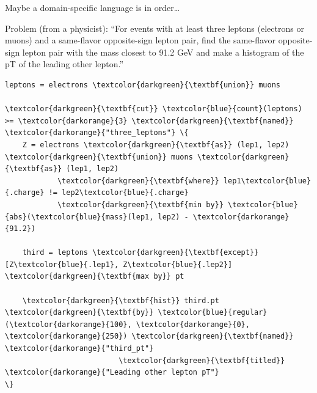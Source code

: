 \documentclass[aspectratio=169]{beamer}
\begin{document}
\begin{frame}[fragile]{Maybe a domain-specific language is in order\ldots}
\vspace{0.15 cm}
\begin{block}{Problem (from a physicist):}
``For events with at least three leptons (electrons or muons) and a same-flavor opposite-sign lepton pair, find the same-flavor opposite-sign lepton pair with the mass closest to 91.2 GeV and make a histogram of the pT of the leading other lepton.''
\end{block}

\small
\vspace{0.25 cm}
\begin{Verbatim}[commandchars=\\\{\}]
leptons = electrons \textcolor{darkgreen}{\textbf{union}} muons

\textcolor{darkgreen}{\textbf{cut}} \textcolor{blue}{count}(leptons) >= \textcolor{darkorange}{3} \textcolor{darkgreen}{\textbf{named}} \textcolor{darkorange}{"three_leptons"} \{
    Z = electrons \textcolor{darkgreen}{\textbf{as}} (lep1, lep2) \textcolor{darkgreen}{\textbf{union}} muons \textcolor{darkgreen}{\textbf{as}} (lep1, lep2)
            \textcolor{darkgreen}{\textbf{where}} lep1\textcolor{blue}{.charge} != lep2\textcolor{blue}{.charge}
            \textcolor{darkgreen}{\textbf{min by}} \textcolor{blue}{abs}(\textcolor{blue}{mass}(lep1, lep2) - \textcolor{darkorange}{91.2})

    third = leptons \textcolor{darkgreen}{\textbf{except}} [Z\textcolor{blue}{.lep1}, Z\textcolor{blue}{.lep2}] \textcolor{darkgreen}{\textbf{max by}} pt

    \textcolor{darkgreen}{\textbf{hist}} third.pt \textcolor{darkgreen}{\textbf{by}} \textcolor{blue}{regular}(\textcolor{darkorange}{100}, \textcolor{darkorange}{0}, \textcolor{darkorange}{250}) \textcolor{darkgreen}{\textbf{named}} \textcolor{darkorange}{"third_pt"}
                          \textcolor{darkgreen}{\textbf{titled}} \textcolor{darkorange}{"Leading other lepton pT"}
\}
\end{Verbatim}
\end{frame}
\end{document}
